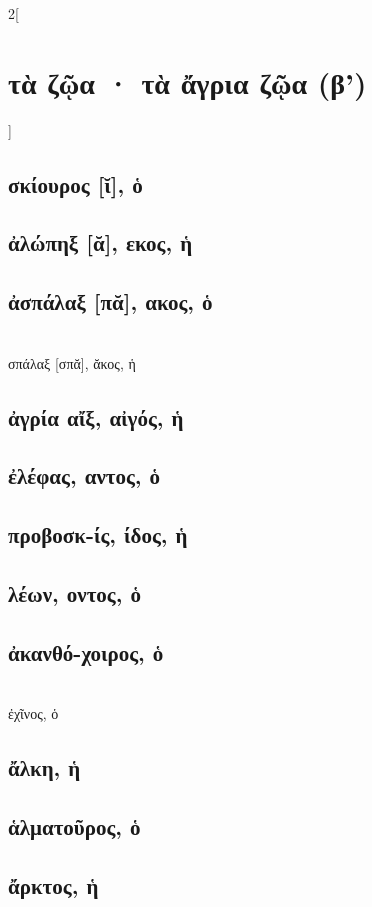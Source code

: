 \documentclass{book}
\begin{document}
\begin{multicols}{2}[\section{τὰ ζῷα · τὰ ἄγρια ζῷα (β')}]
\subsection{σκίουρος [ῐ], ὁ}
\subsection{ἀλώπηξ [ᾰ], εκος, ἡ}
\subsection{ἀσπάλαξ [πᾰ], ακος, ὁ}
 ~\\
σπάλαξ [σπᾰ], ᾰκος, ἡ
\subsection{ἀγρία αἴξ, αἰγός, ἡ}
\subsection{ἐλέφας, αντος, ὁ}
\subsection{προβοσκ-ίς, ίδος, ἡ}
\subsection{λέων, οντος, ὁ}
\subsection{ἀκανθό-χοιρος, ὁ}
 ~\\
ἐχῖνος, ὁ
\subsection{ἄλκη, ἡ}
\subsection{ἁλματοῦρος, ὁ}
\subsection{ἄρκτος, ἡ}

\end{multicols}
\end{document}
